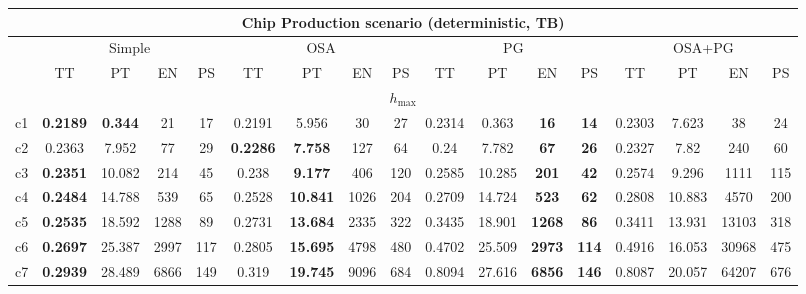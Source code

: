 \begin{tabular}{||c||c|c|c|c|c|c|c|c|c|c|c|c|c|c|c|c||}%
\multicolumn{17}{c}{\textbf{Chip Production scenario (deterministic, TB)}}\\%
\hline%
&\multicolumn{4}{|c|}{\small{Simple}}&\multicolumn{4}{|c|}{\small{OSA}}&\multicolumn{4}{|c|}{\small{PG}}&\multicolumn{4}{|c|}{\small{OSA+PG}}\\%
\hline%
&\small{TT}&\small{PT}&\small{EN}&\small{PS}&\small{TT}&\small{PT}&\small{EN}&\small{PS}&\small{TT}&\small{PT}&\small{EN}&\small{PS}&\small{TT}&\small{PT}&\small{EN}&\small{PS}\\%
\hline%
\multicolumn{17}{||c||}{$h_{\max}$}\\%
\hline%
c1&\small{\textbf{0.2189}}&\small{\textbf{0.344}}&\small{21}&\small{17}&\small{0.2191}&\small{5.956}&\small{30}&\small{27}&\small{0.2314}&\small{0.363}&\small{\textbf{16}}&\small{\textbf{14}}&\small{0.2303}&\small{7.623}&\small{38}&\small{24}\\%
\hline%
c2&\small{0.2363}&\small{7.952}&\small{77}&\small{29}&\small{\textbf{0.2286}}&\small{\textbf{7.758}}&\small{127}&\small{64}&\small{0.24}&\small{7.782}&\small{\textbf{67}}&\small{\textbf{26}}&\small{0.2327}&\small{7.82}&\small{240}&\small{60}\\%
\hline%
c3&\small{\textbf{0.2351}}&\small{10.082}&\small{214}&\small{45}&\small{0.238}&\small{\textbf{9.177}}&\small{406}&\small{120}&\small{0.2585}&\small{10.285}&\small{\textbf{201}}&\small{\textbf{42}}&\small{0.2574}&\small{9.296}&\small{1111}&\small{115}\\%
\hline%
c4&\small{\textbf{0.2484}}&\small{14.788}&\small{539}&\small{65}&\small{0.2528}&\small{\textbf{10.841}}&\small{1026}&\small{204}&\small{0.2709}&\small{14.724}&\small{\textbf{523}}&\small{\textbf{62}}&\small{0.2808}&\small{10.883}&\small{4570}&\small{200}\\%
\hline%
c5&\small{\textbf{0.2535}}&\small{18.592}&\small{1288}&\small{89}&\small{0.2731}&\small{\textbf{13.684}}&\small{2335}&\small{322}&\small{0.3435}&\small{18.901}&\small{\textbf{1268}}&\small{\textbf{86}}&\small{0.3411}&\small{13.931}&\small{13103}&\small{318}\\%
\hline%
c6&\small{\textbf{0.2697}}&\small{25.387}&\small{2997}&\small{117}&\small{0.2805}&\small{\textbf{15.695}}&\small{4798}&\small{480}&\small{0.4702}&\small{25.509}&\small{\textbf{2973}}&\small{\textbf{114}}&\small{0.4916}&\small{16.053}&\small{30968}&\small{475}\\%
\hline%
c7&\small{\textbf{0.2939}}&\small{28.489}&\small{6866}&\small{149}&\small{0.319}&\small{\textbf{19.745}}&\small{9096}&\small{684}&\small{0.8094}&\small{27.616}&\small{\textbf{6856}}&\small{\textbf{146}}&\small{0.8087}&\small{20.057}&\small{64207}&\small{676}\\%

\end{tabular}
